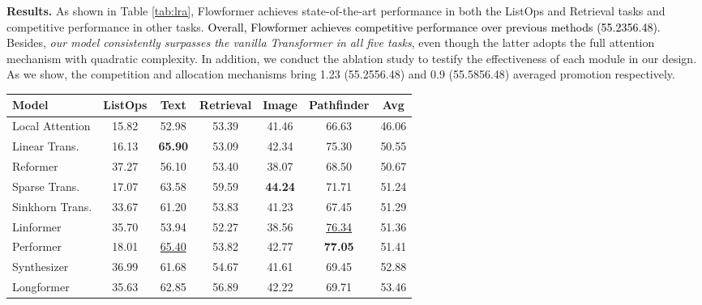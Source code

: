 \documentclass[nohyperref]{article}
\theoremstyle{plain}
\theoremstyle{definition}
\theoremstyle{remark}
\newcommand{\update}[1]{{\textcolor{black}{#1}}}
\begin{document}
\textbf{Results.} As shown in Table \ref{tab:lra}, Flowformer achieves state-of-the-art performance in both the ListOps and Retrieval tasks and competitive performance in other tasks. \update{Overall, Flowformer achieves competitive performance over previous methods (55.2356.48).} Besides, \emph{our model consistently surpasses the vanilla Transformer in all five tasks}, even though the latter adopts the full attention mechanism with quadratic complexity. In addition, we conduct the ablation study to testify the effectiveness of each module in our design. As we show, the competition and allocation mechanisms bring 1.23 (55.2556.48) and 0.9 (55.5856.48) averaged promotion respectively.

\begin{table*}[h]
	\caption{Results on the Long-Range Arena. The best result is in bold and the second best is underlined. Classification accuracy is recorded.}
	\label{tab:lra}
	\vspace{-5pt}
	\vskip 0.15in
	\centering
	\begin{small}
		\begin{sc}
			\renewcommand{\multirowsetup}{\centering}
			\setlength{\tabcolsep}{4.3pt}
			\begin{tabular}{l|ccccc|c}
				\toprule
				Model & ListOps  & Text  & Retrieval  & Image  & Pathfinder  & Avg  \\
				\midrule
				Local Attention \citep{tay2021long} & 15.82 & 52.98 & 53.39 & 41.46 & 66.63 & 46.06 \\
				Linear Trans. \citep{Katharopoulos2020TransformersAR} & 16.13 & \textbf{65.90} & 53.09 & 42.34 & 75.30 & 50.55 \\
				Reformer \citep{kitaev2020reformer} & 37.27 & 56.10 & 53.40 & 38.07 & 68.50 & 50.67 \\
				Sparse Trans. \citep{Child2019GeneratingLS} & 17.07 & 63.58 & 59.59 & \textbf{44.24} & 71.71 & 51.24 \\
				Sinkhorn Trans. \citep{Tay2020SparseSA} & 33.67 & 61.20 & 53.83 & 41.23 & 67.45 & 51.29 \\
				Linformer \citep{Wang2020LinformerSW} & 35.70 & 53.94 & 52.27 & 38.56 & \underline{76.34} & 51.36 \\
				Performer \citep{performer} & 18.01 & \underline{65.40} & 53.82 & 42.77 & \textbf{77.05} & 51.41 \\
				Synthesizer \citep{Tay2021SynthesizerRS} & 36.99 & 61.68 & 54.67 & 41.61 & 69.45 & 52.88 \\
				Longformer \citep{Beltagy2020LongformerTL} & 35.63 & 62.85 & 56.89 & 42.22 & 69.71 & 53.46 \\

\end{tabular}
\end{sc}
\end{small}
\end{table*}
\end{document}
